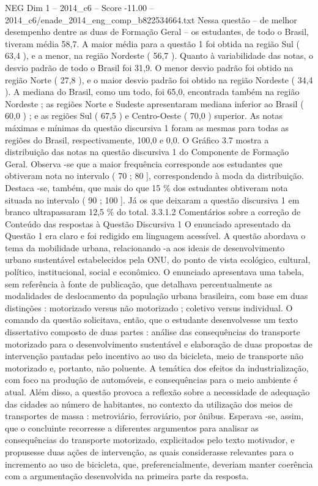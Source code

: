 \begin{textsample}{NEG Dim 1 – 2014\_c6 – Score -11.00 – 2014\_c6/enade\_2014\_eng\_comp\_b822534664.txt}
Nessa questão – de melhor desempenho dentre as duas de Formação Geral – os estudantes, de todo o Brasil, tiveram média 58,7.
A maior média para a questão 1 foi obtida na região Sul ( 63,4 ), e a menor, na região Nordeste ( 56,7 ).
Quanto à variabilidade das notas, o desvio padrão de todo o Brasil foi 31,9.
O menor desvio padrão foi obtido na região Norte ( 27,8 ), e o maior desvio padrão foi obtido na região Nordeste ( 34,4 ).
A mediana do Brasil, como um todo, foi 65,0, encontrada também na região Nordeste ; as regiões Norte e Sudeste apresentaram mediana inferior ao Brasil ( 60,0 ) ; e as regiões Sul ( 67,5 ) e Centro-Oeste ( 70,0 ) superior.
As notas máximas e mínimas da questão discursiva 1 foram as mesmas para todas as regiões do Brasil, respectivamente, 100,0 e 0,0.
O Gráfico 3.7 mostra a distribuição das notas na questão discursiva 1 do Componente de Formação Geral.
Observa -se que a maior frequência corresponde aos estudantes que obtiveram nota no intervalo ( 70 ; 80 ], correspondendo à moda da distribuição.
Destaca -se, também, que mais do que 15 \% dos estudantes obtiveram nota situada no intervalo ( 90 ; 100 ].
Já os que deixaram a questão discursiva 1 em branco ultrapassaram 12,5 \% do total. 3.3.1.2 Comentários sobre a correção de Conteúdo das respostas à Questão Discursiva 1 O enunciado apresentado da Questão 1 era claro e foi redigido em linguagem acessível.
A questão abordava o tema da mobilidade urbana, relacionando -a aos ideais de desenvolvimento urbano sustentável estabelecidos pela ONU, do ponto de vista ecológico, cultural, político, institucional, social e econômico.
O enunciado apresentava uma tabela, sem referência à fonte de publicação, que detalhava percentualmente as modalidades de deslocamento da população urbana brasileira, com base em duas distinções : motorizado versus não motorizado ; coletivo versus individual.
O comando da questão solicitava, então, que o estudante desenvolvesse um texto dissertativo composto de duas partes : análise das consequências do transporte motorizado para o desenvolvimento sustentável e elaboração de duas propostas de intervenção pautadas pelo incentivo ao uso da bicicleta, meio de transporte não motorizado e, portanto, não poluente.
A temática dos efeitos da industrialização, com foco na produção de automóveis, e consequências para o meio ambiente é atual.
Além disso, a questão provoca a reflexão sobre a necessidade de adequação das cidades ao número de habitantes, no contexto da utilização dos meios de transportes de massa : metroviário, ferroviário, por ônibus.
Esperava -se, assim, que o concluinte recorresse a diferentes argumentos para analisar as consequências do transporte motorizado, explicitados pelo texto motivador, e propusesse duas ações de intervenção, as quais considerasse relevantes para o incremento ao uso de bicicleta, que, preferencialmente, deveriam manter coerência com a argumentação desenvolvida na primeira parte da resposta.

\end{textsample}
